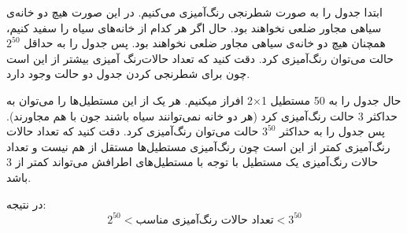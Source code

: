     \p
    ابتدا جدول را به صورت شطرنجی رنگ‌آمیزی می‌کنیم. در این صورت هیچ دو خانه‌ی سیاهی مجاور ضلعی نخواهند بود. حال اگر هر کدام از خانه‌های سیاه را سفید کنیم، همچنان هیچ دو خانه‌ی سیاهی مجاور ضلعی نخواهند بود. پس جدول را به حداقل $2^{50}$ حالت می‌توان رنگ‌آمیزی کرد. دقت کنید که تعداد حالات‌رنگ آمیزی بیشتر از این است چون برای شطرنجی کردن جدول دو حالت وجود دارد.

    \p
    حال جدول را به 50 مستطیل 1×2 افراز میکنیم. هر یک از این مستطیل‌ها را می‌توان به حداکثر 3 حالت رنگ‌آمیزی کرد (هر دو خانه نمی‌توانند سیاه باشند جون با هم مجاورند). پس جدول را به حداکثر $3^{50}$ حالت می‌توان رنگ‌آمیزی کرد. دقت کنید که تعداد حالات رنگ‌آمیزی کمتر از این است چون رنگ‌آمیزی مستطیل‌ها مستقل از هم نیست و تعداد حالات رنگ‌آمیزی یک مستطیل با توجه با مستطیل‌های اطرافش می‌تواند کمتر از 3 باشد.

    \p
    در نتیجه:
    $$2^{50} < \text{تعداد حالات رنگ‌آمیزی مناسب} < 3^{50}$$

